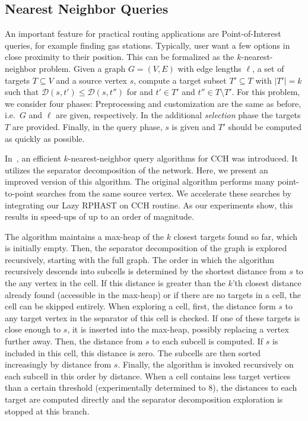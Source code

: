 \documentclass[a4paper, english, cleveref]{lipics-v2021}
\newcommand*{\dist}{\mathcal{D}}
\begin{document}
\subsection{Nearest Neighbor Queries}

An important feature for practical routing applications are Point-of-Interest queries, for example finding gas stations.
Typically, user want a few options in close proximity to their position.
This can be formalized as the $k$-nearest-neighbor problem.
Given a graph $G=(V,E)$ with edge lengths $\ell$, a set of targets $T \subseteq V$ and a source vertex $s$, compute a target subset $T' \subseteq T$ with $|T'| = k$ such that $\dist(s, t') \leq \dist(s, t'')$ for and $t' \in T'$ and $t'' \in T \setminus T'$.
For this problem, we consider four phases:
Preprocessing and customization are the same as before, i.e.\ $G$ and $\ell$ are given, respectively.
In the additional \emph{selection} phase the targets $T$ are provided.
Finally, in the query phase, $s$ is given and $T'$ should be computed as quickly as possible.

In~\cite{TODO}, an efficient $k$-nearest-neighbor query algorithms for CCH was introduced.
It utilizes the separator decomposition of the network.
Here, we present an improved version of this algorithm.
The original algorithm performs many point-to-point searches from the same source vertex.
We accelerate these searches by integrating our Lazy RPHAST on CCH routine.
As our experiments show, this results in speed-ups of up to an order of magnitude.

The algorithm maintains a max-heap of the $k$ closest targets found so far, which is initially empty.
Then, the separator decomposition of the graph is explored recursively, starting with the full graph.
The order in which the algorithm recursively descends into subcells is determined by the shortest distance from $s$ to the any vertex in the cell.
If this distance is greater than the $k$'th closest distance already found (accessible in the max-heap) or if there are no targets in a cell, the cell can be skipped entirely.
When exploring a cell, first, the distance form $s$ to any target vertex in the separator of this cell is checked.
If one of these targets is close enough to $s$, it is inserted into the max-heap, possibly replacing a vertex further away.
Then, the distance from $s$ to each subcell is computed.
If $s$ is included in this cell, this distance is zero.
The subcells are then sorted increasingly by distance from $s$.
Finally, the algorithm is invoked recursively on each subcell in this order by distance.
When a cell contains less target vertices than a certain threshold (experimentally determined to 8), the distances to each target are computed directly and the separator decomposition exploration is stopped at this branch.
\end{document}
